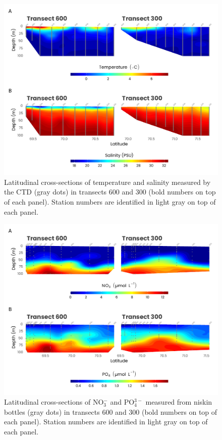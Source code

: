 \documentclass[essd, manuscript]{copernicus}
\begin{document}
\clearpage

\begin{figure}[H]
	\centering
	\includegraphics[scale = 1]{../../../graphs/fig04.pdf}
	\caption{Latitudinal cross-sections of temperature and salinity measured by the CTD (gray dots) in transects 600 and 300 (bold numbers on top of each panel). Station numbers are identified in light gray on top of each panel.}
\end{figure}

\clearpage

\begin{figure}[H]
	\centering
	\includegraphics[scale = 1]{../../../graphs/fig05.pdf}
	\caption{Latitudinal cross-sections of NO$_3^-$ and PO$_4^{3-}$ measured from niskin bottles (gray dots) in transects 600 and 300 (bold numbers on top of each panel). Station numbers are identified in light gray on top of each panel.}
\end{figure}
\end{document}
